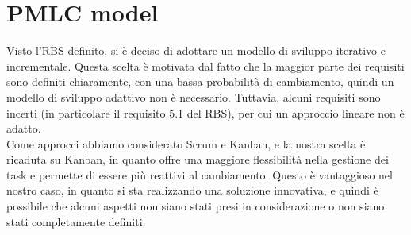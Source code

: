 \documentclass[a4paper,12pt]{article}
\begin{document}
\section{PMLC model}
Visto l'RBS definito, si è deciso di adottare un modello di sviluppo iterativo e incrementale. Questa scelta è motivata
dal fatto che la maggior parte dei requisiti sono definiti chiaramente, con una bassa probabilità di cambiamento,
quindi un modello di sviluppo adattivo non è necessario. Tuttavia, alcuni requisiti sono incerti (in particolare il
requisito 5.1 del RBS), per cui un approccio lineare non è adatto.\\
Come approcci abbiamo considerato Scrum e Kanban, e la nostra scelta è ricaduta su Kanban, in quanto offre una maggiore
flessibilità nella gestione dei task e permette di essere più reattivi al cambiamento. Questo è vantaggioso nel nostro
caso, in quanto si sta realizzando una soluzione innovativa, e quindi è possibile che alcuni aspetti non siano stati
presi in considerazione o non siano stati completamente definiti.
\end{document}

